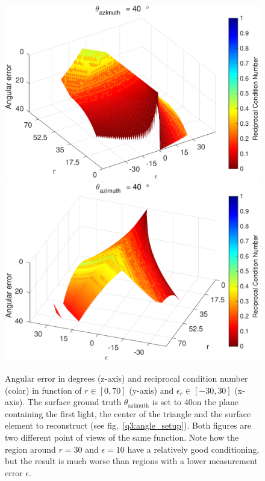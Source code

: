 \documentclass{report}
\begin{document}
\begin{figure}
  \centering
  \includegraphics[width=0.45\linewidth]{q3_experiment_1_view_1.pdf}
  \includegraphics[width=0.45\linewidth]{q3_experiment_1_view_2.pdf}
  \caption[Experiment 1]
   {Angular error in degrees (z-axis) and reciprocal condition number (color) in function of $r \in \left[0, 70\right]$ (y-axis) and $\epsilon_r \in \left[-30, 30\right]$ (x-axis). The surface ground truth $\theta_{\text{azimuth}}$ is set to 40\degree on the plane containing the first light, the center of the triangle and the surface element to reconstruct (see fig.~\ref{q3:angle_setup}). Both figures are two different point of views of the same function. Note how the region around $r = 30$ and $\epsilon = 10$ have a relatively good conditioning, but the result is much worse than regions with a lower measurement error $\epsilon$.}
  \label{q3:exp1}
\end{figure}
\end{document}
